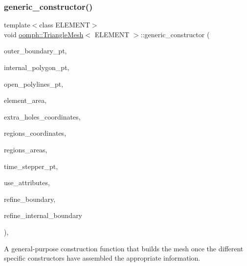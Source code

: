 \subsubsection{\texorpdfstring{generic\+\_\+constructor()}{generic\_constructor()}}
{\footnotesize\ttfamily template$<$class E\+L\+E\+M\+E\+NT$>$ \\
void \hyperlink{classoomph_1_1TriangleMesh}{oomph\+::\+Triangle\+Mesh}$<$ E\+L\+E\+M\+E\+NT $>$\+::generic\+\_\+constructor (\begin{DoxyParamCaption}\item[{\hyperlink{classoomph_1_1Vector}{Vector}$<$ \hyperlink{classoomph_1_1TriangleMeshPolygon}{Triangle\+Mesh\+Polygon} $\ast$$>$ \&}]{outer\+\_\+boundary\+\_\+pt,  }\item[{\hyperlink{classoomph_1_1Vector}{Vector}$<$ \hyperlink{classoomph_1_1TriangleMeshPolygon}{Triangle\+Mesh\+Polygon} $\ast$$>$ \&}]{internal\+\_\+polygon\+\_\+pt,  }\item[{\hyperlink{classoomph_1_1Vector}{Vector}$<$ \hyperlink{classoomph_1_1TriangleMeshOpenCurve}{Triangle\+Mesh\+Open\+Curve} $\ast$$>$ \&}]{open\+\_\+polylines\+\_\+pt,  }\item[{const double \&}]{element\+\_\+area,  }\item[{\hyperlink{classoomph_1_1Vector}{Vector}$<$ \hyperlink{classoomph_1_1Vector}{Vector}$<$ double $>$ $>$ \&}]{extra\+\_\+holes\+\_\+coordinates,  }\item[{std\+::map$<$ unsigned, \hyperlink{classoomph_1_1Vector}{Vector}$<$ double $>$ $>$ \&}]{regions\+\_\+coordinates,  }\item[{std\+::map$<$ unsigned, double $>$ \&}]{regions\+\_\+areas,  }\item[{\hyperlink{classoomph_1_1TimeStepper}{Time\+Stepper} $\ast$}]{time\+\_\+stepper\+\_\+pt,  }\item[{const bool \&}]{use\+\_\+attributes,  }\item[{const bool \&}]{refine\+\_\+boundary,  }\item[{const bool \&}]{refine\+\_\+internal\+\_\+boundary }\end{DoxyParamCaption})\hspace{0.3cm}{\ttfamily [inline]}, {\ttfamily [protected]}}



A general-\/purpose construction function that builds the mesh once the different specific constructors have assembled the appropriate information. 




